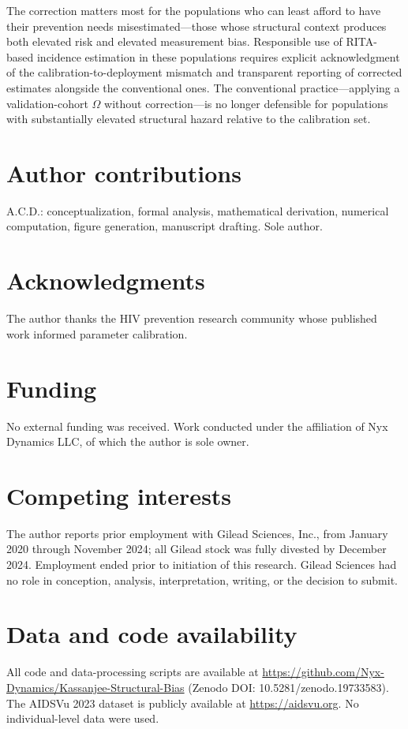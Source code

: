 \documentclass[11pt]{article}
\begin{document}
The correction matters most for the populations who can least afford to have their prevention needs misestimated---those whose structural context produces both elevated risk and elevated measurement bias. Responsible use of RITA-based incidence estimation in these populations requires explicit acknowledgment of the calibration-to-deployment mismatch and transparent reporting of corrected estimates alongside the conventional ones. The conventional practice---applying a validation-cohort $\Omega$ without correction---is no longer defensible for populations with substantially elevated structural hazard relative to the calibration set.

\section*{Author contributions}
A.C.D.: conceptualization, formal analysis, mathematical derivation, numerical computation, figure generation, manuscript drafting. Sole author.

\section*{Acknowledgments}
The author thanks the HIV prevention research community whose published work informed parameter calibration.

\section*{Funding}
No external funding was received. Work conducted under the affiliation of Nyx Dynamics LLC, of which the author is sole owner.

\section*{Competing interests}
The author reports prior employment with Gilead Sciences, Inc., from January 2020 through November 2024; all Gilead stock was fully divested by December 2024. Employment ended prior to initiation of this research. Gilead Sciences had no role in conception, analysis, interpretation, writing, or the decision to submit.

\section*{Data and code availability}
All code and data-processing scripts are available at \url{https://github.com/Nyx-Dynamics/Kassanjee-Structural-Bias} (Zenodo DOI: 10.5281/zenodo.19733583). The AIDSVu 2023 dataset is publicly available at \url{https://aidsvu.org}. No individual-level data were used.
\end{document}
